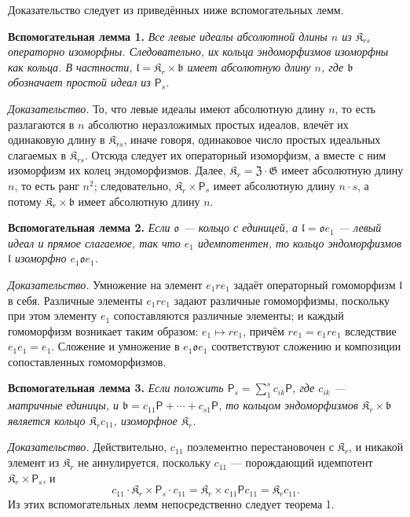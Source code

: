 \documentclass[11pt]{article}
\begin{document}
Доказательство следует из приведённых ниже вспомогательных лемм.

\noindent\textbf{Вспомогательная лемма 1.} \emph{Все левые идеалы абсолютной длины \(n\) из \(\mathfrak K_{rs}\) операторно изоморфны. Следовательно, их кольца эндоморфизмов изоморфны как кольца. В частности, \(\mathfrak l=\mathfrak K_r\times\mathfrak b\) имеет абсолютную длину \(n\), где \(\mathfrak b\) обозначает простой идеал из \(\mathsf{P}_s\).}

\noindent\emph{Доказательство.} То, что левые идеалы имеют абсолютную длину \(n\), то есть разлагаются в \(n\) абсолютно неразложимых простых идеалов, влечёт их одинаковую длину в \(\mathfrak K_{rs}\), иначе говоря, одинаковое число простых идеальных слагаемых в \(\mathfrak K_{rs}\). Отсюда следует их операторный изоморфизм, а вместе с ним изоморфизм их колец эндоморфизмов. Далее, \(\mathfrak K_r=\mathfrak Z\cdot\mathfrak G\) имеет абсолютную длину \(n\), то есть ранг \(n^2\); следовательно, \(\mathfrak K_r\times \mathsf{P}_s\) имеет абсолютную длину \(n\cdot s\), а потому \(\mathfrak K_r\times\mathfrak b\) имеет абсолютную длину \(n\).

\noindent\textbf{Вспомогательная лемма 2.} \emph{Если \(\mathfrak o\) --- кольцо с единицей, а \(\mathfrak l=\mathfrak o e_1\) --- левый идеал и прямое слагаемое, так что \(e_1\) идемпотентен, то кольцо эндоморфизмов \(\mathfrak l\) изоморфно \(e_1\mathfrak o e_1\).}

\noindent\emph{Доказательство.} Умножение на элемент \(e_1re_1\) задаёт операторный гомоморфизм \(\mathfrak l\) в себя. Различные элементы \(e_1re_1\) задают различные гомоморфизмы, поскольку при этом элементу \(e_1\) сопоставляются различные элементы; и каждый гомоморфизм возникает таким образом: \(e_1\mapsto re_1\), причём \(re_1=e_1re_1\) вследствие \(e_1e_1=e_1\). Сложение и умножение в \(e_1\mathfrak o e_1\) соответствуют сложению и композиции сопоставленных гомоморфизмов.

\noindent\textbf{Вспомогательная лемма 3.} \emph{Если положить \(\mathsf{P}_s=\sum_1^s c_{ik}\mathsf{P}\), где \(c_{ik}\) --- матричные единицы, и \(\mathfrak b=c_{11}\mathsf{P}+\cdots+c_{s1}\mathsf{P}\), то кольцом эндоморфизмов \(\mathfrak K_r\times\mathfrak b\) является кольцо \(\mathfrak K_rc_{11}\), изоморфное \(\mathfrak K_r\).}

\noindent\emph{Доказательство.} Действительно, \(c_{11}\) поэлементно перестановочен с \(\mathfrak K_r\), и никакой элемент из \(\mathfrak K_r\) не аннулируется, поскольку \(c_{11}\) --- порождающий идемпотент \(\mathfrak K_r\times \mathsf{P}_s\), и
\[
c_{11}\cdot\mathfrak K_r\times \mathsf{P}_s\cdot c_{11}
=\mathfrak K_r\times c_{11}\mathsf Pc_{11}
=\mathfrak K_rc_{11}.
\]
Из этих вспомогательных лемм непосредственно следует теорема 1.
\end{document}
